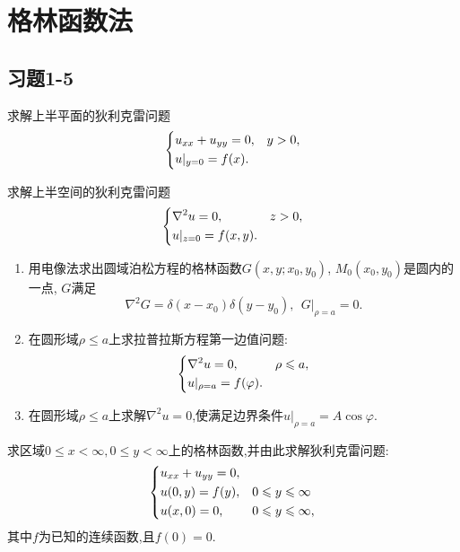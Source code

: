 
\chapter{格林函数法}

\section{习题1-5}

\begin{yyEx}
	求解上半平面的狄利克雷问题
	\begin{equation*}
		\begin{dcases}
			u_{xx}+u_{yy} = 0,&y>0,\\
			u|_{y=0} = f(x).&~
		\end{dcases}
	\end{equation*}
\end{yyEx}

\begin{yyEx}
	求解上半空间的狄利克雷问题
	\begin{equation*}
	\begin{dcases}
	\nabla^2u = 0,&z>0,\\
	u|_{z=0} = f(x,y).&~
	\end{dcases}
	\end{equation*}
\end{yyEx}

\begin{yyEx}
	\begin{enumerate}
		\item 用电像法求出圆域泊松方程的格林函数$G(x,y;x_0,y_0)$, $M_0(x_0,y_0)$是圆内的一点, $G$满足
		\begin{equation*}
			\nabla^2G = \delta(x-x_0)\delta(y-y_0),~~G|_{\rho = a} = 0.
		\end{equation*}
		\item 在圆形域$\rho\leqslant a$上求拉普拉斯方程第一边值问题:
		\begin{equation*}
		\begin{dcases}
			\nabla^2u = 0,&\rho\leqslant a,\\
			u|_{\rho = a} = f(\varphi).&~
		\end{dcases}
		\end{equation*}
		\item 在圆形域$\rho\leqslant a$上求解$\nabla^2u = 0$,使满足边界条件$u|_{\rho = a} = A\cos\varphi$.
	\end{enumerate}
\end{yyEx}

\begin{yyEx}
	求区域$0\leqslant x<\infty,0\leqslant y<\infty$上的格林函数,并由此求解狄利克雷问题:
	\begin{equation*}
	\begin{dcases}
	u_{xx}+u_{yy} = 0,&~\\
	u(0,y) = f(y),&0\leqslant y\leqslant\infty\\
	u(x,0) = 0,&0\leqslant y\leqslant\infty,
	\end{dcases}
	\end{equation*}
	其中$f$为已知的连续函数,且$f(0) = 0$.
\end{yyEx}

